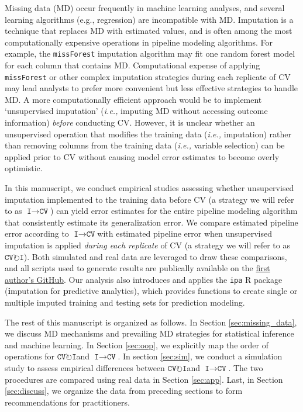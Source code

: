 \documentclass[AMA,STIX1COL,doublespace]{WileyNJD-v2}
\begin{document}
Missing data (MD) occur frequently in machine learning analyses, and
several learning algorithms (e.g., regression) are incompatible with MD.
Imputation is a technique that replaces MD with estimated values, and is
often among the most computationally expensive operations in pipeline
modeling algorithms. For example, the \texttt{missForest} imputation
algorithm may fit one random forest model for each column that contains
MD. Computational expense of applying \texttt{missForest} or other
complex imputation strategies during each replicate of CV may lead
analysts to prefer more convenient but less effective strategies to
handle MD. A more computationally efficient approach would be to
implement `unsupervised imputation' (\textit{i.e., }imputing MD without
accessing outcome information) \emph{before} conducting CV. However, it
is unclear whether an unsupervised operation that modifies the training
data (\textit{i.e., }imputation) rather than removing columns from the
training data (\textit{i.e., }variable selection) can be applied prior
to CV without causing model error estimates to become overly optimistic.

In this manuscript, we conduct empirical studies assessing whether
unsupervised imputation implemented to the training data before CV (a
strategy we will refer to as $\texttt{I}\!\!\rightarrow\!\texttt{CV}$)
can yield error estimates for the entire pipeline modeling algorithm
that consistently estimate its generalization error. We compare
estimated pipeline error according to
$\texttt{I}\!\!\rightarrow\!\texttt{CV}$\space with estimated pipeline
error when unsupervised imputation is applied
\emph{during each replicate} of CV (a strategy we will refer to as
$\texttt{CV}\!\circlearrowright\!\texttt{I}$). Both simulated and real
data are leveraged to draw these comparisons, and all scripts used to
generate results are publically available on the
\href{https://github.com/bcjaeger/Imputation-and-CV}{first author's
GitHub}. Our analysis also introduces and applies the \texttt{ipa} R
package (\textbf{i}mputation for \textbf{p}redictive
\textbf{a}nalytics), which provides functions to create single or
multiple imputed training and testing sets for prediction modeling.

The rest of this manuscript is organized as follows. In Section
\ref{sec:missing_data}, we discuss MD mechanisms and prevailing MD
strategies for statistical inference and machine learning. In Section
\ref{sec:oop}, we explicitly map the order of operations for
$\texttt{CV}\!\circlearrowright\!\texttt{I}$\space and
$\texttt{I}\!\!\rightarrow\!\texttt{CV}$. In section \ref{sec:sim}, we
conduct a simulation study to assess empirical differences between
$\texttt{CV}\!\circlearrowright\!\texttt{I}$\space and
$\texttt{I}\!\!\rightarrow\!\texttt{CV}$. The two procedures are
compared using real data in Section \ref{sec:app}. Last, in Section
\ref{sec:discuss}, we organize the data from preceding sections to form
recommendations for practitioners.
\end{document}
